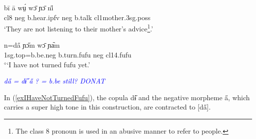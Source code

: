 \documentclass[10pt,twoside]{article}
\def\ci#1{{\ipaFont #1}}
\newcommand{\gl}[1]{`#1'}
\def\VSP{\vspace{0pt}}
\newcommand{\cl}[1]{{\sc cl#1}}
\newcommand{\pref}[1]{(\ref{#1})}
\def\elicited{$^\diamond$}
\newcommand{\comment}[1]{\textcolor{blue}{\emph{#1}}}
\begin{document}
%
%
%
\begin{exe} 
	\ex \label{exTheyAreNotListening}	
	
		\gll 	bī ā wṳ́ wɔ̄ ɲɔ̄ ni̋	\\
		 	\cl8  {\sc neg} b.hear.{\sc ipfv} 	{\sc neg} b.talk	\cl1mother.{\sc 3sg.poss} \\
		\glt \VSP \gl{They are not listening to their mother's advice\footnote{The class 8 pronoun is used in an abusive manner to refer to people.}.}
\end{exe}%

\begin{exe} 
	\ex \label{exIHaveNotTurnedFufu}	

		\gll 	n=da̋ ɲɔ̋m wɔ̄ ɲa᷆m	\\
		 	{\sc 1sg.top}=b.be.{\sc neg} b.turn.fufu  {\sc neg} \cl14.fufu	\\
		\glt \VSP \elicited \gl{I have not turned fufu yet.}
\end{exe}%

\comment{da̋ = dɨ̋ a̋ ? = b.be still? DONAT}

\noindent
In \pref{exIHaveNotTurnedFufu}, the copula \ci{dɨ̋} and the negative morpheme \ci{a̋}, which carries a super high tone in this construction, are contracted to [\ci{da̋}].
\end{document}
